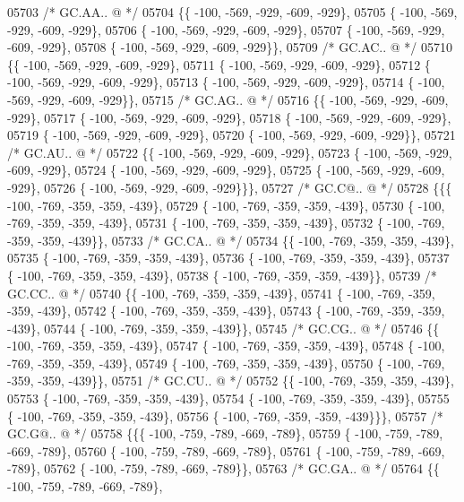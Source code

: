 \begin{DoxyCode}
05703 \textcolor{comment}{/* GC.AA.. @ */}
05704 \{\{ -100, -569, -929, -609, -929\},
05705 \{ -100, -569, -929, -609, -929\},
05706 \{ -100, -569, -929, -609, -929\},
05707 \{ -100, -569, -929, -609, -929\},
05708 \{ -100, -569, -929, -609, -929\}\},
05709 \textcolor{comment}{/* GC.AC.. @ */}
05710 \{\{ -100, -569, -929, -609, -929\},
05711 \{ -100, -569, -929, -609, -929\},
05712 \{ -100, -569, -929, -609, -929\},
05713 \{ -100, -569, -929, -609, -929\},
05714 \{ -100, -569, -929, -609, -929\}\},
05715 \textcolor{comment}{/* GC.AG.. @ */}
05716 \{\{ -100, -569, -929, -609, -929\},
05717 \{ -100, -569, -929, -609, -929\},
05718 \{ -100, -569, -929, -609, -929\},
05719 \{ -100, -569, -929, -609, -929\},
05720 \{ -100, -569, -929, -609, -929\}\},
05721 \textcolor{comment}{/* GC.AU.. @ */}
05722 \{\{ -100, -569, -929, -609, -929\},
05723 \{ -100, -569, -929, -609, -929\},
05724 \{ -100, -569, -929, -609, -929\},
05725 \{ -100, -569, -929, -609, -929\},
05726 \{ -100, -569, -929, -609, -929\}\}\},
05727 \textcolor{comment}{/* GC.C@.. @ */}
05728 \{\{\{ -100, -769, -359, -359, -439\},
05729 \{ -100, -769, -359, -359, -439\},
05730 \{ -100, -769, -359, -359, -439\},
05731 \{ -100, -769, -359, -359, -439\},
05732 \{ -100, -769, -359, -359, -439\}\},
05733 \textcolor{comment}{/* GC.CA.. @ */}
05734 \{\{ -100, -769, -359, -359, -439\},
05735 \{ -100, -769, -359, -359, -439\},
05736 \{ -100, -769, -359, -359, -439\},
05737 \{ -100, -769, -359, -359, -439\},
05738 \{ -100, -769, -359, -359, -439\}\},
05739 \textcolor{comment}{/* GC.CC.. @ */}
05740 \{\{ -100, -769, -359, -359, -439\},
05741 \{ -100, -769, -359, -359, -439\},
05742 \{ -100, -769, -359, -359, -439\},
05743 \{ -100, -769, -359, -359, -439\},
05744 \{ -100, -769, -359, -359, -439\}\},
05745 \textcolor{comment}{/* GC.CG.. @ */}
05746 \{\{ -100, -769, -359, -359, -439\},
05747 \{ -100, -769, -359, -359, -439\},
05748 \{ -100, -769, -359, -359, -439\},
05749 \{ -100, -769, -359, -359, -439\},
05750 \{ -100, -769, -359, -359, -439\}\},
05751 \textcolor{comment}{/* GC.CU.. @ */}
05752 \{\{ -100, -769, -359, -359, -439\},
05753 \{ -100, -769, -359, -359, -439\},
05754 \{ -100, -769, -359, -359, -439\},
05755 \{ -100, -769, -359, -359, -439\},
05756 \{ -100, -769, -359, -359, -439\}\}\},
05757 \textcolor{comment}{/* GC.G@.. @ */}
05758 \{\{\{ -100, -759, -789, -669, -789\},
05759 \{ -100, -759, -789, -669, -789\},
05760 \{ -100, -759, -789, -669, -789\},
05761 \{ -100, -759, -789, -669, -789\},
05762 \{ -100, -759, -789, -669, -789\}\},
05763 \textcolor{comment}{/* GC.GA.. @ */}
05764 \{\{ -100, -759, -789, -669, -789\},

\end{DoxyCode}

